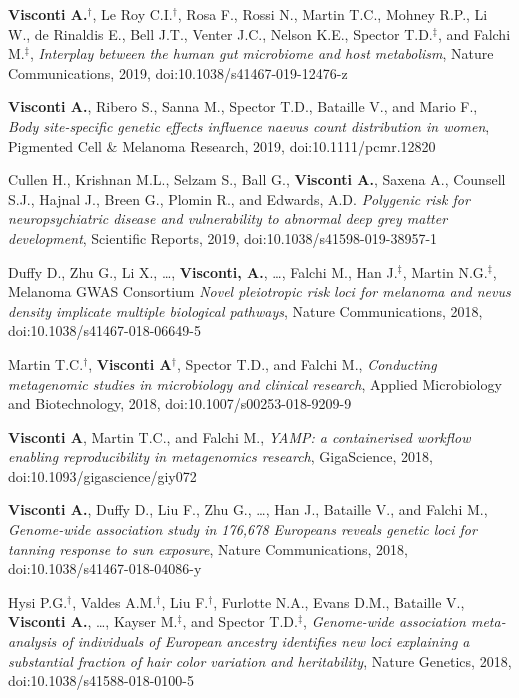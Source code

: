 \documentclass[a4paper,10pt]{article}
\begin{document}
{\begin{itemize}
		 \textbf{Visconti A.}$^{\textbf{$\dag $}}$, Le Roy C.I.$^{\textbf{$\dag $}}$, Rosa F., Rossi N., Martin T.C., Mohney R.P., Li W., de Rinaldis E., Bell J.T., Venter J.C., Nelson K.E., Spector T.D.$^{\textbf{$\ddag $}}$, and Falchi M.$^{\textbf{$\ddag $}}$, \emph{Interplay between the human gut microbiome and host metabolism}, Nature Communications, 2019, doi:10.1038/s41467-019-12476-z

		 \textbf{Visconti A.}, Ribero S., Sanna M., Spector T.D., Bataille V., and Mario F., \emph{Body site-specific genetic effects influence naevus count distribution in women}, Pigmented Cell \& Melanoma Research, 2019, doi:10.1111/pcmr.12820

		 Cullen H., Krishnan M.L., Selzam S., Ball G., \textbf{Visconti A.}, Saxena A., Counsell S.J., Hajnal J., Breen G., Plomin R., and Edwards, A.D. \emph{Polygenic risk for neuropsychiatric disease and vulnerability to abnormal deep grey matter development}, Scientific Reports, 2019, doi:10.1038/s41598-019-38957-1

		 Duffy D., Zhu G., Li X., \dots, \textbf{Visconti, A.}, \dots, Falchi M., Han J.$^{\textbf{$\ddag $}}$, Martin N.G.$^{\textbf{$\ddag $}}$, Melanoma GWAS Consortium \emph{Novel pleiotropic risk loci for melanoma and nevus density implicate multiple biological pathways}, Nature Communications, 2018, doi:10.1038/s41467-018-06649-5

		 Martin T.C.$^{\textbf{$\dag $}}$, \textbf{Visconti A}$^{\textbf{$\dag $}}$, Spector T.D., and Falchi M., \emph{Conducting metagenomic studies in microbiology and clinical research}, Applied Microbiology and Biotechnology, 2018, doi:10.1007/s00253-018-9209-9

		 \textbf{Visconti A}, Martin T.C., and Falchi M., \emph{YAMP: a containerised workflow enabling reproducibility in metagenomics research}, GigaScience, 2018, doi:10.1093/gigascience/giy072

		  \textbf{Visconti A.}, Duffy D., Liu F., Zhu G., \dots, Han J., Bataille V., and Falchi M., \emph{Genome-wide association study in 176,678 Europeans reveals genetic loci for tanning response to sun exposure}, Nature Communications, 2018, doi:10.1038/s41467-018-04086-y

		 Hysi P.G.$^{\textbf{$\dag $}}$, Valdes A.M.$^{\textbf{$\dag $}}$, Liu F.$^{\textbf{$\dag $}}$, Furlotte N.A., Evans D.M., Bataille V., \textbf{Visconti A.}, \dots, Kayser M.$^{\textbf{$\ddag $}}$, and Spector T.D.$^{\textbf{$\ddag $}}$, \emph{Genome-wide association meta-analysis of individuals of European ancestry identifies new loci explaining a substantial fraction of hair color variation and heritability}, Nature Genetics, 2018, doi:10.1038/s41588-018-0100-5

	\end{itemize}
}
\end{document}
